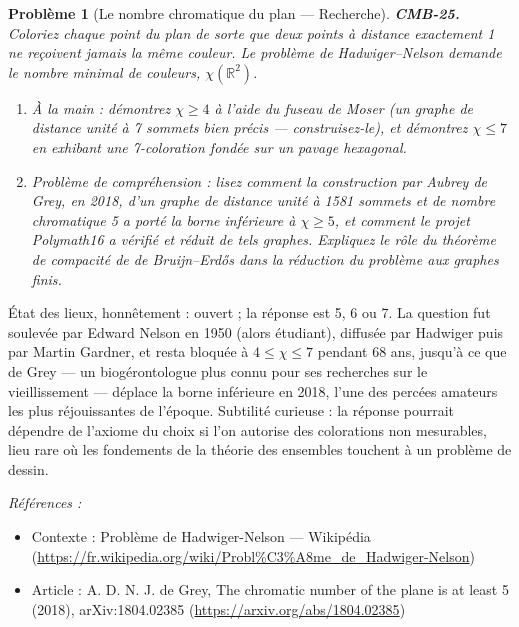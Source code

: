 \documentclass[11pt]{article}
\newtheorem{problem}{Problème}
\newenvironment{refs}{\par\small\noindent\emph{Références :}\begin{itemize}\setlength\itemsep{0pt}}{\end{itemize}\normalsize}
\begin{document}
\bigskip

\begin{problem}[{Le nombre chromatique du plan --- Recherche}]
\textbf{CMB-25.} Coloriez chaque point du plan de sorte que deux points à distance exactement
1 ne reçoivent jamais la même couleur. Le problème de Hadwiger--Nelson demande le nombre minimal
de couleurs, $ \chi(\mathbb{R}^2) $.
\begin{enumerate}
\item[(a)] À la main : démontrez $ \chi \ge 4 $ à l'aide du fuseau de Moser (un graphe de distance
unité à 7 sommets bien précis --- construisez-le), et démontrez $ \chi \le 7 $ en exhibant une
7-coloration fondée sur un pavage hexagonal.
\item[(b)] Problème de compréhension : lisez comment la construction par Aubrey de Grey, en 2018, d'un
graphe de distance unité à 1581 sommets et de nombre chromatique 5 a porté la borne inférieure à
$ \chi \ge 5 $, et comment le projet Polymath16 a vérifié et réduit de tels graphes. Expliquez
le rôle du théorème de compacité de de Bruijn--Erd\H{o}s dans la réduction du problème aux graphes
finis.
\end{enumerate}

\end{problem}

\noindent État des lieux, honnêtement : ouvert ; la réponse est 5, 6 ou 7. La question
fut soulevée par Edward Nelson en 1950 (alors étudiant), diffusée par Hadwiger puis par Martin
Gardner, et resta bloquée à $ 4 \le \chi \le 7 $ pendant 68 ans, jusqu'à ce que de Grey --- un
biogérontologue plus connu pour ses recherches sur le vieillissement --- déplace la borne inférieure
en 2018, l'une des percées amateurs les plus réjouissantes de l'époque. Subtilité curieuse : la
réponse pourrait dépendre de l'axiome du choix si l'on autorise des colorations non mesurables,
lieu rare où les fondements de la théorie des ensembles touchent à un problème de dessin.

\begin{refs}
\item Contexte : Problème de Hadwiger-Nelson --- Wikipédia (\url{https://fr.wikipedia.org/wiki/Probl%C3%A8me_de_Hadwiger-Nelson})
\item Article : A. D. N. J. de Grey, \og{} The chromatic number of the plane is at least 5 \fg{} (2018), arXiv:1804.02385 (\url{https://arxiv.org/abs/1804.02385})
\end{refs}

\bigskip
\end{document}
